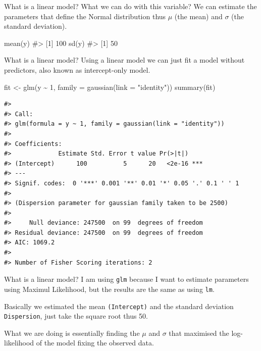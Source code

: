 \documentclass[
  ignorenonframetext,
]{beamer}
\newenvironment{Shaded}{\begin{snugshade}}{\end{snugshade}}
\newcommand{\AttributeTok}[1]{\textcolor[rgb]{0.40,0.45,0.13}{#1}}
\newcommand{\CommentTok}[1]{\textcolor[rgb]{0.37,0.37,0.37}{#1}}
\newcommand{\DecValTok}[1]{\textcolor[rgb]{0.68,0.00,0.00}{#1}}
\newcommand{\FunctionTok}[1]{\textcolor[rgb]{0.28,0.35,0.67}{#1}}
\newcommand{\NormalTok}[1]{\textcolor[rgb]{0.00,0.23,0.31}{#1}}
\newcommand{\OtherTok}[1]{\textcolor[rgb]{0.00,0.23,0.31}{#1}}
\newcommand{\SpecialCharTok}[1]{\textcolor[rgb]{0.37,0.37,0.37}{#1}}
\newcommand{\StringTok}[1]{\textcolor[rgb]{0.13,0.47,0.30}{#1}}
\begin{document}
\begin{frame}[fragile]{What is a linear model?}
\label{what-is-a-linear-model-1}
What we can do with this variable? We can estimate the parameters that
define the Normal distribution thus \(\mu\) (the mean) and \(\sigma\)
(the standard deviation).

\begin{Shaded}
\begin{Highlighting}[]
\FunctionTok{mean}\NormalTok{(y)}
\CommentTok{\#\textgreater{} [1] 100}
\FunctionTok{sd}\NormalTok{(y)}
\CommentTok{\#\textgreater{} [1] 50}
\end{Highlighting}
\end{Shaded}
\end{frame}

\begin{frame}[fragile]{What is a linear model?}
\label{what-is-a-linear-model-2}
Using a linear model we can just fit a model without predictors, also
known as intercept-only model.

\begin{Shaded}
\begin{Highlighting}[]
\NormalTok{fit }\OtherTok{\textless{}{-}} \FunctionTok{glm}\NormalTok{(y }\SpecialCharTok{\textasciitilde{}} \DecValTok{1}\NormalTok{, }\AttributeTok{family =} \FunctionTok{gaussian}\NormalTok{(}\AttributeTok{link =} \StringTok{"identity"}\NormalTok{))}
\FunctionTok{summary}\NormalTok{(fit)}
\end{Highlighting}
\end{Shaded}

\begin{verbatim}
#> 
#> Call:
#> glm(formula = y ~ 1, family = gaussian(link = "identity"))
#> 
#> Coefficients:
#>             Estimate Std. Error t value Pr(>|t|)    
#> (Intercept)      100          5      20   <2e-16 ***
#> ---
#> Signif. codes:  0 '***' 0.001 '**' 0.01 '*' 0.05 '.' 0.1 ' ' 1
#> 
#> (Dispersion parameter for gaussian family taken to be 2500)
#> 
#>     Null deviance: 247500  on 99  degrees of freedom
#> Residual deviance: 247500  on 99  degrees of freedom
#> AIC: 1069.2
#> 
#> Number of Fisher Scoring iterations: 2
\end{verbatim}
\end{frame}

\begin{frame}[fragile]{What is a linear model?}
\label{what-is-a-linear-model-3}
I am using \texttt{glm} because I want to estimate parameters using
Maximul Likelihood, but the results are the same as using \texttt{lm}.

Basically we estimated the mean \texttt{(Intercept)} and the standard
deviation \texttt{Dispersion}, just take the square root thus 50.

What we are doing is essentially finding the \(\mu\) and \(\sigma\) that
maximised the log-likelihood of the model fixing the observed data.
\end{frame}
\end{document}

